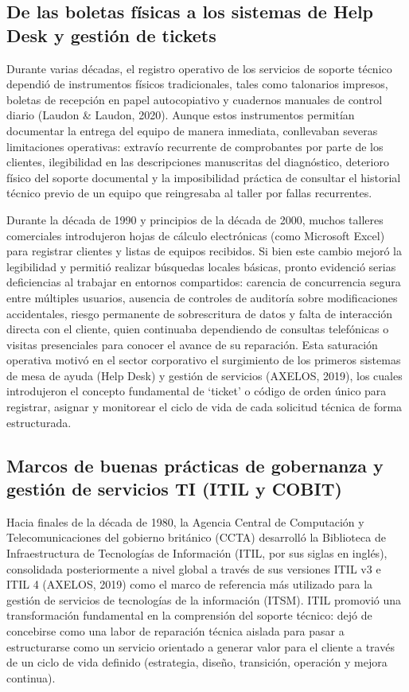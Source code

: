 \subsection{De las boletas físicas a los sistemas de Help Desk y gestión de tickets}

Durante varias décadas, el registro operativo de los servicios de soporte técnico dependió de instrumentos físicos tradicionales, tales como talonarios impresos, boletas de recepción en papel autocopiativo y cuadernos manuales de control diario (Laudon \& Laudon, 2020). Aunque estos instrumentos permitían documentar la entrega del equipo de manera inmediata, conllevaban severas limitaciones operativas: extravío recurrente de comprobantes por parte de los clientes, ilegibilidad en las descripciones manuscritas del diagnóstico, deterioro físico del soporte documental y la imposibilidad práctica de consultar el historial técnico previo de un equipo que reingresaba al taller por fallas recurrentes.

Durante la década de 1990 y principios de la década de 2000, muchos talleres comerciales introdujeron hojas de cálculo electrónicas (como Microsoft Excel) para registrar clientes y listas de equipos recibidos. Si bien este cambio mejoró la legibilidad y permitió realizar búsquedas locales básicas, pronto evidenció serias deficiencias al trabajar en entornos compartidos: carencia de concurrencia segura entre múltiples usuarios, ausencia de controles de auditoría sobre modificaciones accidentales, riesgo permanente de sobrescritura de datos y falta de interacción directa con el cliente, quien continuaba dependiendo de consultas telefónicas o visitas presenciales para conocer el avance de su reparación. Esta saturación operativa motivó en el sector corporativo el surgimiento de los primeros sistemas de mesa de ayuda (Help Desk) y gestión de servicios (AXELOS, 2019), los cuales introdujeron el concepto fundamental de `ticket' o código de orden único para registrar, asignar y monitorear el ciclo de vida de cada solicitud técnica de forma estructurada.

\subsection{Marcos de buenas prácticas de gobernanza y gestión de servicios TI (ITIL y COBIT)}

Hacia finales de la década de 1980, la Agencia Central de Computación y Telecomunicaciones del gobierno británico (CCTA) desarrolló la Biblioteca de Infraestructura de Tecnologías de Información (ITIL, por sus siglas en inglés), consolidada posteriormente a nivel global a través de sus versiones ITIL v3 e ITIL 4 (AXELOS, 2019) como el marco de referencia más utilizado para la gestión de servicios de tecnologías de la información (ITSM). ITIL promovió una transformación fundamental en la comprensión del soporte técnico: dejó de concebirse como una labor de reparación técnica aislada para pasar a estructurarse como un servicio orientado a generar valor para el cliente a través de un ciclo de vida definido (estrategia, diseño, transición, operación y mejora continua).

